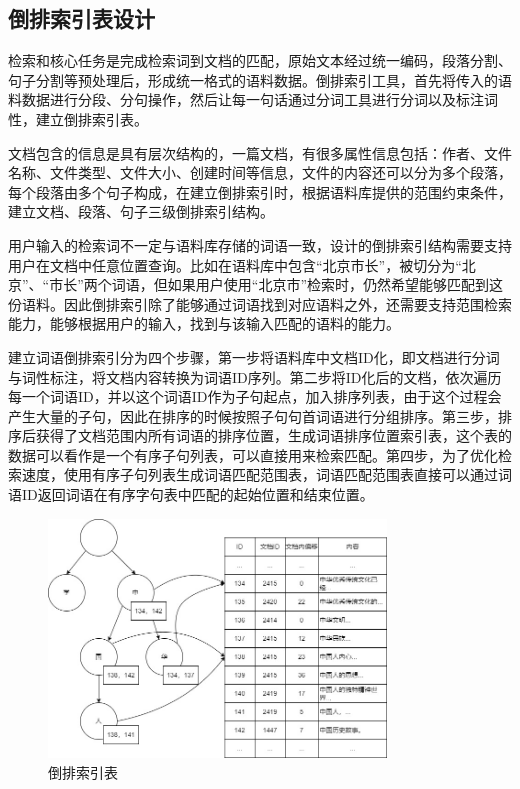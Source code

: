 \documentclass[11pt]{article}
\begin{document}
\begin{CJK*}{UTF8}{gbsn}
\subsection{倒排索引表设计}

检索和核心任务是完成检索词到文档的匹配，原始文本经过统一编码，段落分割、句子分割等预处理后，形成统一格式的语料数据。倒排索引工具，首先将传入的语料数据进行分段、分句操作，然后让每一句话通过分词工具进行分词以及标注词性，建立倒排索引表。

文档包含的信息是具有层次结构的，一篇文档，有很多属性信息包括：作者、文件名称、文件类型、文件大小、创建时间等信息，文件的内容还可以分为多个段落，每个段落由多个句子构成，在建立倒排索引时，根据语料库提供的范围约束条件，建立文档、段落、句子三级倒排索引结构。

用户输入的检索词不一定与语料库存储的词语一致，设计的倒排索引结构需要支持用户在文档中任意位置查询。比如在语料库中包含“北京市长”，被切分为“北京”、“市长”两个词语，但如果用户使用“北京市”检索时，仍然希望能够匹配到这份语料。因此倒排索引除了能够通过词语找到对应语料之外，还需要支持范围检索能力，能够根据用户的输入，找到与该输入匹配的语料的能力。

建立词语倒排索引分为四个步骤，第一步将语料库中文档ID化，即文档进行分词与词性标注，将文档内容转换为词语ID序列。第二步将ID化后的文档，依次遍历每一个词语ID，并以这个词语ID作为子句起点，加入排序列表，由于这个过程会产生大量的子句，因此在排序的时候按照子句句首词语进行分组排序。第三步，排序后获得了文档范围内所有词语的排序位置，生成词语排序位置索引表，这个表的数据可以看作是一个有序子句列表，可以直接用来检索匹配。第四步，为了优化检索速度，使用有序子句列表生成词语匹配范围表，词语匹配范围表直接可以通过词语ID返回词语在有序字句表中匹配的起始位置和结束位置。

\begin{figure}[!h]
	\centering
	\includegraphics[width=0.8\textwidth]{image/daopaibiao.jpg}
	\caption{倒排索引表}
	\label{fig:daopaibiao}
\end{figure}


\end{CJK*}
\end{document}
